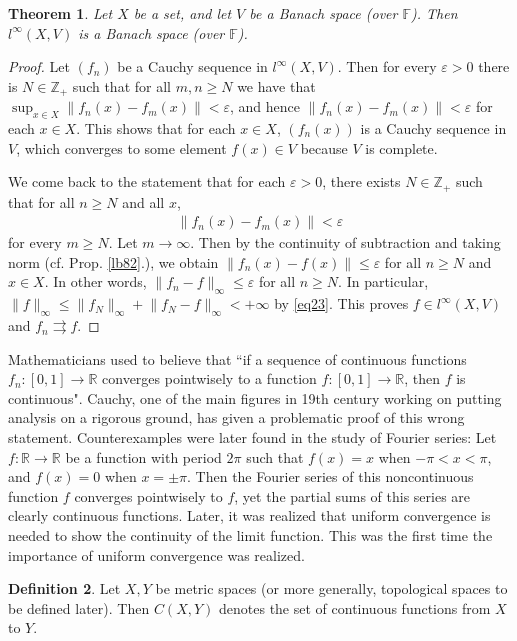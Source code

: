 \documentclass[12pt,b5paper,notitlepage]{article}
\theoremstyle{definition}
\newtheorem{df}{Definition}[section]
\theoremstyle{plain}
\newtheorem{thm}[df]{Theorem}
\newcommand{\Zbb}{\mathbb Z}
\newcommand{\Rbb}{\mathbb R}
\newcommand{\Fbb}{\mathbb F}
\newcommand{\eps}{\varepsilon}
\numberwithin{equation}{section}
\begin{document}
\begin{thm}\label{lb85}
Let $X$ be a set, and let $V$ be a Banach space (over $\Fbb$). Then $l^\infty(X,V)$ is a Banach space (over $\Fbb$).
\end{thm}


\begin{proof}
Let $(f_n)$ be a Cauchy sequence in $l^\infty(X,V)$. Then for every $\eps>0$ there is $N\in\Zbb_+$ such that for all $m,n\geq N$ we have that $\sup_{x\in X}\lVert f_n(x)-f_m(x)\lVert <\eps$, and hence $\lVert f_n(x)-f_m(x)\lVert <\eps$ for each $x\in X$. This shows that for each $x\in X$, $(f_n(x))$ is a Cauchy sequence in $V$, which converges to some element $f(x)\in V$ because $V$ is complete.

We come back to the statement that for each $\eps>0$, there exists $N\in\Zbb_+$ such that for all $n\geq N$ and all $x$,
\begin{align*}
\lVert f_n(x)-f_m(x)\lVert <\eps  
\end{align*}
for every $m\geq N$. Let $m\rightarrow\infty$. Then by the continuity of subtraction and taking norm (cf. Prop. \ref{lb82}.), we obtain $\lVert f_n(x)-f(x)\lVert\leq \eps$ for all $n\geq N$ and $x\in X$. In other words, $\lVert f_n-f\lVert_\infty\leq\eps$ for all $n\geq N$. In particular, $\lVert f\lVert_\infty\leq\lVert f_N\lVert_\infty +\lVert f_N-f\lVert_\infty<+\infty$ by \eqref{eq23}. This proves $f\in l^\infty(X,V)$ and $f_n\rightrightarrows f$.
\end{proof}


Mathematicians used to believe that ``if a sequence of continuous functions $f_n:[0,1]\rightarrow\Rbb$ converges pointwisely to a function $f:[0,1]\rightarrow\Rbb$, then $f$ is continuous". Cauchy, one of the main figures in 19th century working on putting analysis on a rigorous ground, has given a problematic proof of this wrong statement. Counterexamples were later found in the study of Fourier series: Let $f:\Rbb\rightarrow\Rbb$ be a function with period $2\pi$ such that $f(x)=x$ when $-\pi<x<\pi$, and $f(x)=0$ when $x=\pm \pi$. Then the Fourier series  of this noncontinuous function $f$ converges pointwisely to $f$, yet the partial sums of this series are clearly continuous functions. Later, it was realized that uniform convergence is needed to show the continuity of the limit function. This was the first time the importance of uniform convergence was realized.

\begin{df}
Let $X,Y$ be  metric spaces (or more generally, topological spaces to be defined later). Then $C(X,Y)$  denotes the set of continuous functions from $X$ to $Y$. 
\end{df}
\end{document}
